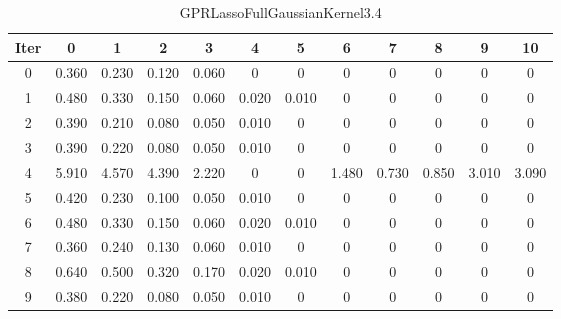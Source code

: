 \begin{table}
	\begin{center}
		\begin{tabular}{|c|c|c|c|c|c|c|c|c|c|c|c|}
			\hline
			Iter & 0 & 1 & 2 & 3 & 4 & 5 & 6 & 7 & 8 & 9 & 10 \\
			\hline
			0 & 0.360 & 0.230 & 0.120 & 0.060 & 0 & 0 & 0 & 0 & 0 & 0 & 0 \\
			\hline
			1 & 0.480 & 0.330 & 0.150 & 0.060 & 0.020 & 0.010 & 0 & 0 & 0 & 0 & 0 \\
			\hline
			2 & 0.390 & 0.210 & 0.080 & 0.050 & 0.010 & 0 & 0 & 0 & 0 & 0 & 0 \\
			\hline
			3 & 0.390 & 0.220 & 0.080 & 0.050 & 0.010 & 0 & 0 & 0 & 0 & 0 & 0 \\
			\hline
			4 & 5.910 & 4.570 & 4.390 & 2.220 & 0 & 0 & 1.480 & 0.730 & 0.850 & 3.010 & 3.090 \\
			\hline
			5 & 0.420 & 0.230 & 0.100 & 0.050 & 0.010 & 0 & 0 & 0 & 0 & 0 & 0 \\
			\hline
			6 & 0.480 & 0.330 & 0.150 & 0.060 & 0.020 & 0.010 & 0 & 0 & 0 & 0 & 0 \\
			\hline
			7 & 0.360 & 0.240 & 0.130 & 0.060 & 0.010 & 0 & 0 & 0 & 0 & 0 & 0 \\
			\hline
			8 & 0.640 & 0.500 & 0.320 & 0.170 & 0.020 & 0.010 & 0 & 0 & 0 & 0 & 0 \\
			\hline
			9 & 0.380 & 0.220 & 0.080 & 0.050 & 0.010 & 0 & 0 & 0 & 0 & 0 & 0 \\
			\hline
		\end{tabular}
	\end{center}
	\caption{GPRLassoFullGaussianKernel3.4}
\end{table}